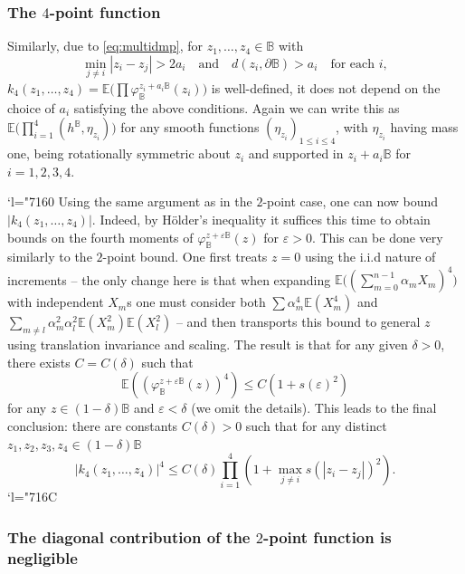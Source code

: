 \documentclass[JEP,XML,SOM,Unicode,published]{cedram}
\newcommand{\Changel}{\mathcode`l="7160}
\newcommand{\Changelback}{\mathcode`l="716C}
\theoremstyle{definition}
\newcommand{\E}{\mathbb{E}}
\newcommand{\B}{\mathbb{B}}\let\D\B\let\Ub\B
\let\eps\varepsilon
\begin{document}
\subsubsection*{The $4$-point function}
Similarly, due to \eqref{eq:multidmp}, for $z_1,\dots, z_4\in \B$ with
\[
\min_{j\ne i}{|z_i-z_j|}>2a_i\quad\text{and}\quad d(z_i,\partial \B)>a_i\quad\text{for each $i$},
\]
$k_4(z_1,\dots, z_4)=\E\bigl(\prod \varphi_\B^{z_i+a_i\B}(z_i)\bigr)$ is well-defined, \ie it does not depend on the choice of $a_i$ satisfying the above conditions. Again we can write this as $\E\bigl(\prod_{i=1}^4(h^\B,\eta_{z_i})\bigr)$ for any smooth functions $(\eta_{z_i})_{1\le i \le 4}$, with $\eta_{z_i}$ having mass one, being rotationally symmetric about $z_i$ and supported in $z_i+a_i\B$ for $i=1,2,3,4$.

\Changel
Using the same argument as in the $2$-point case, one can now bound $|k_4(z_1, \dots, z_4)|$. Indeed, by Hölder's inequality it suffices this time to obtain bounds on the fourth moments of $\varphi_\B^{z+\eps\B}(z)$ for $\eps>0$. This can be done very similarly to the $2$-point bound. One first treats $z = 0$ using the i.i.d nature of increments -- the only change here is that when expanding $\E\bigl((\sum_{m=0}^{n-1} \alpha_m X_m)^4\bigr)$ with independent $X_m$s one must consider both $\sum \alpha_m^4 \E(X_m^4)$ and $\sum_{m\ne l} \alpha_m^2\alpha_l^2 \E(X_m^2)\E(X_l^2)$ -- and then transports this bound to general $z$ using translation invariance and scaling. The result is that for any given $\delta>0$, there exists $C=C(\delta)$ such that
\begin{equation}\label{eq:circlebound2}
\mathbb{E}((\varphi_\B^{z+\eps\B}(z))^4)\le C(1+s(\eps)^2)\end{equation} for any $z\in (1-\delta)\B$ and $\eps<\delta$ (we omit the details). This leads to the final conclusion: there are constants $C(\delta)>0$ such that for any distinct $z_1,z_2,z_3,z_4\in (1-\delta)\B$
\begin{equation}\label{eq:moment_bounds} |k_4(z_1,\dots, z_4)|^4\leq C(\delta)\prod_{i=1}^4 (1+\max_{j\ne i} s(|z_i-z_j|)^2).
\end{equation}
\Changelback

\subsubsection*{The diagonal contribution of the $2$-point function is negligible}
\end{document}
